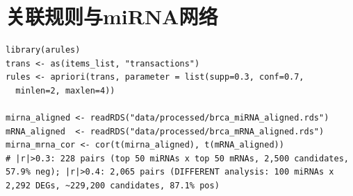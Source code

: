 \documentclass[12pt,a4paper,openany]{ctexbook}
\begin{document}
\section{关联规则与miRNA网络}
\begin{lstlisting}[caption={Apriori关联规则与miRNA-mRNA相关}, basicstyle=\ttfamily\scriptsize]
library(arules)
trans <- as(items_list, "transactions")
rules <- apriori(trans, parameter = list(supp=0.3, conf=0.7,
  minlen=2, maxlen=4))

mirna_aligned <- readRDS("data/processed/brca_miRNA_aligned.rds")
mRNA_aligned  <- readRDS("data/processed/brca_mRNA_aligned.rds")
mirna_mrna_cor <- cor(t(mirna_aligned), t(mRNA_aligned))
# |r|>0.3: 228 pairs (top 50 miRNAs x top 50 mRNAs, 2,500 candidates, 57.9% neg); |r|>0.4: 2,065 pairs (DIFFERENT analysis: 100 miRNAs x 2,292 DEGs, ~229,200 candidates, 87.1% pos)
\end{lstlisting}
\end{document}
